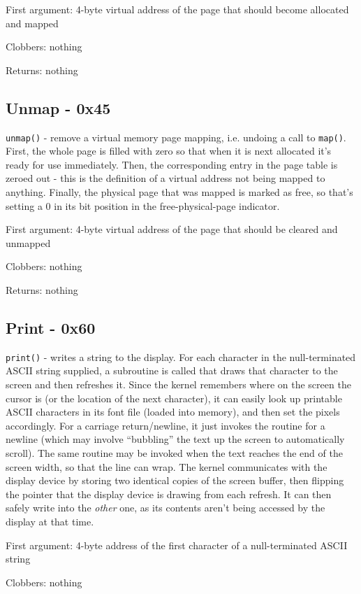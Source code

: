 \documentclass[12pt,a4paper]{report}
\begin{document}
First argument: 4-byte virtual address of the page that should become allocated and mapped

Clobbers: nothing

Returns: nothing

\subsection*{Unmap - 0x45}
\texttt{unmap()} - remove a virtual memory page mapping, i.e. undoing a call to \texttt{map()}. First, the whole page is filled with zero so that when it is next allocated it's ready for use immediately. Then, the corresponding entry in the page table is zeroed out - this is the definition of a virtual address not being mapped to anything. Finally, the physical page that was mapped is marked as free, so that's setting a 0 in its bit position in the free-physical-page indicator.

First argument: 4-byte virtual address of the page that should be cleared and unmapped

Clobbers: nothing

Returns: nothing

\subsection*{Print - 0x60}
\texttt{print()} - writes a string to the display. For each character in the null-terminated ASCII string supplied, a subroutine is called that draws that character to the screen and then refreshes it. Since the kernel remembers where on the screen the cursor is (or the location of the next character), it can easily look up printable ASCII characters in its font file (loaded into memory), and then set the pixels accordingly. For a carriage return/newline, it just invokes the routine for a newline (which may involve ``bubbling'' the text up the screen to automatically scroll). The same routine may be invoked when the text reaches the end of the screen width, so that the line can wrap. The kernel communicates with the display device by storing two identical copies of the screen buffer, then flipping the pointer that the display device is drawing from each refresh. It can then safely write into the \emph{other} one, as its contents aren't being accessed by the display at that time.

First argument: 4-byte address of the first character of a null-terminated ASCII string

Clobbers: nothing
\end{document}
